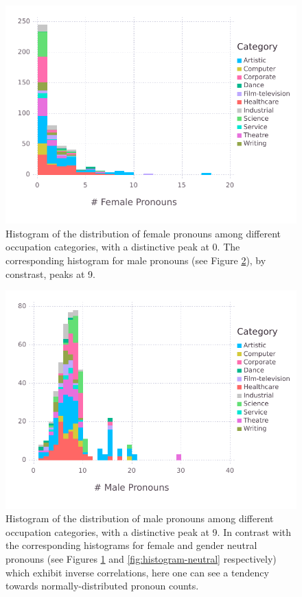 \documentclass{article}
\begin{document}
\begin{figure}[H]
	\centering
	\includegraphics[width=\linewidth]{pictures/histogram-female}
	\caption{Histogram of the distribution of female pronouns among different occupation categories, with a distinctive peak at 0. The corresponding histogram for male pronouns (see Figure \ref{fig:histogram-male}), by constrast, peaks at 9.}
	\label{fig:histogram-female}
\end{figure}

\begin{figure}[H]
	\centering
	\includegraphics[width=\linewidth]{pictures/histogram-male}
	\caption{Histogram of the distribution of male pronouns among different occupation categories, with a distinctive peak at 9. In contrast with the corresponding histograms for female and gender neutral pronouns (see Figures \ref{fig:histogram-female} and \ref{fig:histogram-neutral} respectively) which exhibit inverse correlations, here one can see a tendency towards normally-distributed pronoun counts.}
	\label{fig:histogram-male}
\end{figure}
\end{document}
